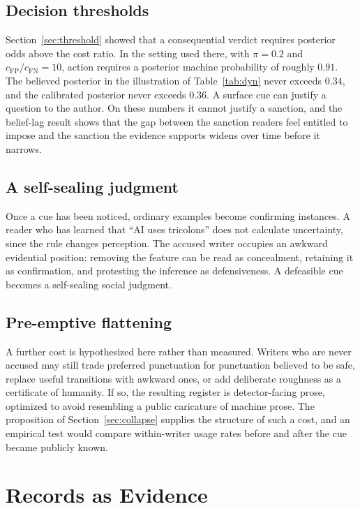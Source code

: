 \documentclass[11pt]{article}
\theoremstyle{plain}
\theoremstyle{definition}
\theoremstyle{remark}
\begin{document}
\subsection{Decision thresholds}

Section~\ref{sec:threshold} showed that a consequential verdict requires posterior odds above the cost ratio. In the setting used there, with $\pi=0.2$ and $c_{\mathrm{FP}}/c_{\mathrm{FN}}=10$, action requires a posterior machine probability of roughly $0.91$. The believed posterior in the illustration of Table~\ref{tab:dyn} never exceeds $0.34$, and the calibrated posterior never exceeds $0.36$. A surface cue can justify a question to the author. On these numbers it cannot justify a sanction, and the belief-lag result shows that the gap between the sanction readers feel entitled to impose and the sanction the evidence supports widens over time before it narrows.

\subsection{A self-sealing judgment}

Once a cue has been noticed, ordinary examples become confirming instances. A reader who has learned that ``AI uses tricolons'' does not calculate uncertainty, since the rule changes perception. The accused writer occupies an awkward evidential position: removing the feature can be read as concealment, retaining it as confirmation, and protesting the inference as defensiveness. A defeasible cue becomes a self-sealing social judgment.

\subsection{Pre-emptive flattening}

A further cost is hypothesized here rather than measured. Writers who are never accused may still trade preferred punctuation for punctuation believed to be safe, replace useful transitions with awkward ones, or add deliberate roughness as a certificate of humanity. If so, the resulting register is detector-facing prose, optimized to avoid resembling a public caricature of machine prose. The proposition of Section~\ref{sec:collapse} supplies the structure of such a cost, and an empirical test would compare within-writer usage rates before and after the cue became publicly known.

\section{Records as Evidence}\label{sec:records}
\end{document}
